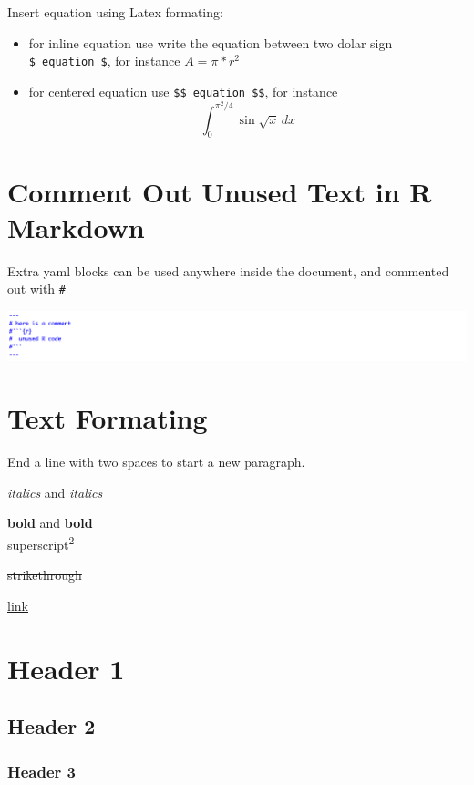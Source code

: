 \documentclass[]{article}
\providecommand{\tightlist}{%
  \setlength{\itemsep}{0pt}\setlength{\parskip}{0pt}}
\begin{document}
Insert equation using Latex formating:

\begin{itemize}
\tightlist
\item
  for inline equation use write the equation between two dolar sign
  \texttt{\$\ equation\ \$}, for instance \(A = \pi*r^{2}\)
\item
  for centered equation use \texttt{\$\$\ equation\ \$\$}, for instance
  \[\int_0^{\pi^2/4} \sin\sqrt{x}\,dx\]
\end{itemize}

\hypertarget{comment-out-unused-text-in-r-markdown}{%
\section{Comment Out Unused Text in R
Markdown}\label{comment-out-unused-text-in-r-markdown}}

Extra yaml blocks can be used anywhere inside the document, and
commented out with \texttt{\#}

\includegraphics{picture6.png}

\hypertarget{text-formating}{%
\section{Text Formating}\label{text-formating}}

End a line with two spaces to start a new paragraph.

\emph{italics} and \emph{italics}

\textbf{bold} and \textbf{bold}\\
superscript\textsuperscript{2}

\sout{strikethrough}

\href{www.rstudio.com}{link}

\hypertarget{header-1}{%
\section{Header 1}\label{header-1}}

\hypertarget{header-2}{%
\subsection{Header 2}\label{header-2}}

\hypertarget{header-3}{%
\subsubsection{Header 3}\label{header-3}}
\end{document}
